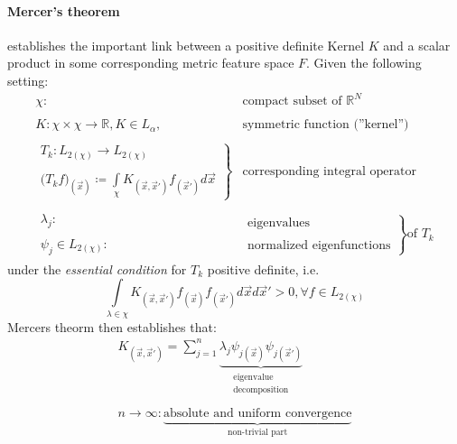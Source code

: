 \paragraph{Mercer's theorem} establishes the important link between a
positive definite Kernel $K$ and a scalar product in some
corresponding metric feature space $F$. Given the following setting:
\[ \begin{array}{ll}
	\chi: & \text{compact subset of } \mathbb{R}^N \\\\
	K: \chi \times \chi \rightarrow \mathbb{R}, K \in L_\alpha,
		& \text{symmetric function (''kernel'')} \\\\
	\left. \begin{array}{l}
		T_k: L_{2 (\chi)} \rightarrow L_{2 (\chi)} \\\\
		\big( T_k f \big)_{(\vec{x})} \coloneqq \int\limits_\chi
			K_{(\vec{x},\vec{x}')} f_{(\vec{x}')}
			d \vec{x}
	\end{array} \right \} & \text{corresponding integral operator}\\\\
	\begin{array}{l}
		\lambda_j: \\\\
		\psi_j \in L_{2 (\chi)}:
	\end{array} & 
		\left. \begin{array}{ll}
			\text{eigenvalues} \\\\
			\text{normalized eigenfunctions}
		\end{array} \right \} \text{of } T_k
\end{array} \]
under the \emph{essential condition} for $T_k$ positive definite, i.e.\
\begin{equation}
	\int\limits_{\lambda \in \chi} K_{(\vec{x}, \vec{x}')} 
		f_{(\vec{x})} f_{(\vec{x}')} d \vec{x} d \vec{x}'
		> 0, \forall f \in L_{2 (\chi)}
\end{equation}
Mercers theorm then establishes that:
\begin{equation}
	\begin{array}{l}
	K_{(\vec{x}, \vec{x}')} = \sum\limits_{j = 1}^n \underbrace{\lambda_j
		\psi_{j (\vec{x})}  \psi_{j (\vec{x}')} }_{
			\substack{\text{eigenvalue} \\
				\text{decomposition}}} \\\\
	n \rightarrow \infty: \underbrace{ \text{absolute and uniform 
		convergence}}_{\text{non-trivial part}}
	\end{array}
\end{equation}
